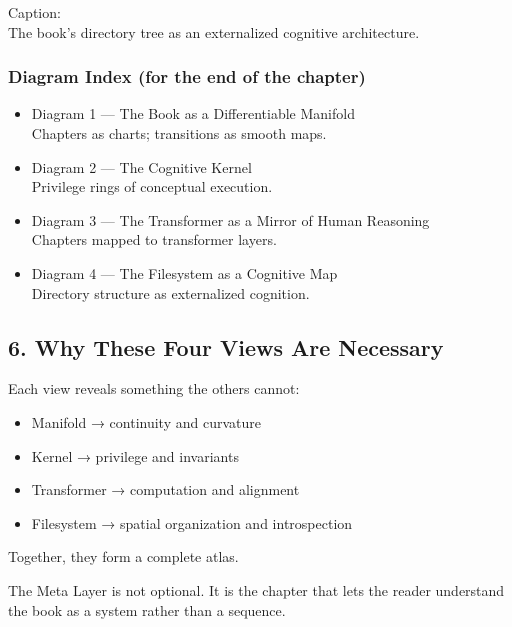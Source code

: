 Caption:\\
The book's directory tree as an externalized cognitive architecture.

\hypertarget{diagram-index-for-the-end-of-the-chapter}{%
\subsubsection{Diagram Index (for the end of the
chapter)}\label{diagram-index-for-the-end-of-the-chapter}}

\begin{itemize}
\tightlist
\item
  Diagram 1 --- The Book as a Differentiable Manifold\\
  Chapters as charts; transitions as smooth maps.
\item
  Diagram 2 --- The Cognitive Kernel\\
  Privilege rings of conceptual execution.
\item
  Diagram 3 --- The Transformer as a Mirror of Human Reasoning\\
  Chapters mapped to transformer layers.
\item
  Diagram 4 --- The Filesystem as a Cognitive Map\\
  Directory structure as externalized cognition.
\end{itemize}

\hypertarget{why-these-four-views-are-necessary}{%
\subsection{6. Why These Four Views Are
Necessary}\label{why-these-four-views-are-necessary}}

Each view reveals something the others cannot:

\begin{itemize}
\tightlist
\item
  Manifold → continuity and curvature
\item
  Kernel → privilege and invariants
\item
  Transformer → computation and alignment
\item
  Filesystem → spatial organization and introspection
\end{itemize}

Together, they form a complete atlas.

The Meta Layer is not optional. It is the chapter that lets the reader
understand the book as a system rather than a sequence.


